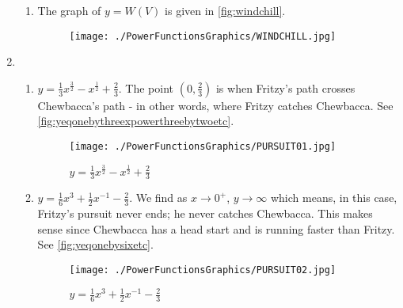 \begin{enumerate}
\begin{enumerate}
\item The graph of $y = W(V)$ is given in \autoref{fig:windchill}.

\begin{figure}
\begin{center}

\texttt{[image: ./PowerFunctionsGraphics/WINDCHILL.jpg]}

\caption{}
\label{fig:windchill}
\end{center}
\end{figure}

\end{enumerate}

\item \begin{enumerate}

\item  $y = \frac{1}{3}x^{\frac{3}{2}} - x^{\frac{1}{2}} + \frac{2}{3}$.  The point $\left(0,\frac{2}{3}\right)$ is when Fritzy's path crosses Chewbacca's path - in other words, where Fritzy catches Chewbacca. See \autoref{fig:yeqonebythreexpowerthreebytwoetc}.

\begin{figure}
\begin{center} 

\texttt{[image: ./PowerFunctionsGraphics/PURSUIT01.jpg]}

\caption{$y = \frac{1}{3}x^{\frac{3}{2}} - x^{\frac{1}{2}} + \frac{2}{3}$}
\label{fig:yeqonebythreexpowerthreebytwoetc}
\end{center}
\end{figure}

\item $y = \frac{1}{6}x^3+\frac{1}{2}x^{-1} - \frac{2}{3}$.  We find as $x \rightarrow 0^{+}$, $y \rightarrow \infty$ which means, in this case, Fritzy's pursuit never ends;  he never catches Chewbacca. This makes sense since Chewbacca has a head start and is running faster than Fritzy. See \autoref{fig:yeqonebysixetc}.

\begin{figure}
\begin{center} 

\texttt{[image: ./PowerFunctionsGraphics/PURSUIT02.jpg]}

\caption{$y = \frac{1}{6}x^3+\frac{1}{2}x^{-1} - \frac{2}{3}$}
\label{fig:yeqonebysixetc}
\end{center}
\end{figure}


\end{enumerate}






\setcounter{HW}{\value{enumi}}
\end{enumerate}


